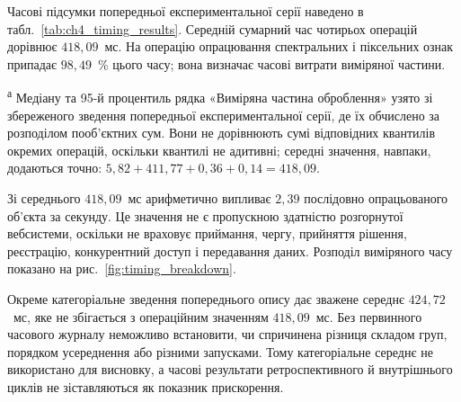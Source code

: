 Часові підсумки попередньої експериментальної серії наведено в табл.~\ref{tab:ch4_timing_results}. Середній сумарний час чотирьох операцій дорівнює $418{,}09$~мс. На операцію опрацювання спектральних і піксельних ознак припадає $98{,}49$~\% цього часу; вона визначає часові витрати виміряної частини.

\begin{table}[htbp]
\caption{Агреговане зведення часу чотирьох операцій попередньої експериментальної серії}
\label{tab:ch4_timing_results}
\centering
\small
{}

\vspace{2pt}
\parbox{0.96\textwidth}{\footnotesize \textsuperscript{а} Медіану та 95-й процентиль рядка «Виміряна частина оброблення» узято зі збереженого зведення попередньої експериментальної серії, де їх обчислено за розподілом пооб’єктних сум. Вони не дорівнюють сумі відповідних квантилів окремих операцій, оскільки квантилі не адитивні; середні значення, навпаки, додаються точно: $5{,}82+411{,}77+0{,}36+0{,}14=418{,}09$.}
\end{table}

Зі середнього $418{,}09$~мс арифметично випливає $2{,}39$ послідовно опрацьованого об’єкта за секунду. Це значення не є пропускною здатністю розгорнутої вебсистеми, оскільки не враховує приймання, чергу, прийняття рішення, реєстрацію, конкурентний доступ і передавання даних. Розподіл виміряного часу показано на рис.~\ref{fig:timing_breakdown}.



Окреме категоріальне зведення попереднього опису дає зважене середнє $424{,}72$~мс, яке не збігається з операційним значенням $418{,}09$~мс. Без первинного часового журналу неможливо встановити, чи спричинена різниця складом груп, порядком усереднення або різними запусками. Тому категоріальне середнє не використано для висновку, а часові результати ретроспективного й внутрішнього циклів не зіставляються як показник прискорення.

